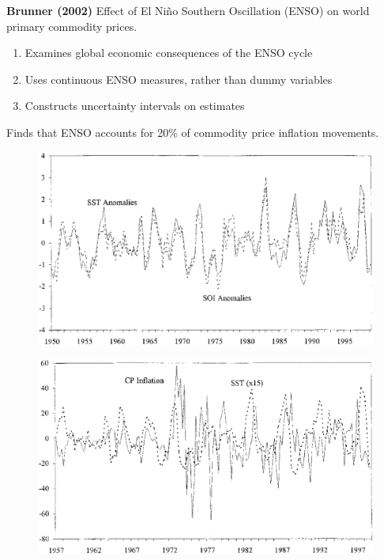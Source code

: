 \documentclass{beamer}
\begin{document}
\begin{frame}
  \textbf{Brunner (2002)} Effect of El Niño Southern Oscillation (ENSO) on world primary commodity prices.\\
  \begin{enumerate}
    \item Examines global economic consequences of the ENSO cycle
    \item Uses continuous ENSO measures, rather than dummy variables
    \item Constructs uncertainty intervals on estimates
  \end{enumerate}  
  \medskip
  Finds that ENSO accounts for 20\% of commodity price inflation movements.
\end{frame}

\begin{frame}
  \begin{figure}
    \includegraphics[scale=.3]{brunner.eps}
  \end{figure}
\end{frame}

\begin{frame}
  \begin{figure}
    \includegraphics[scale=.3]{brunner3.eps}
  \end{figure}
\end{frame}
\end{document}
